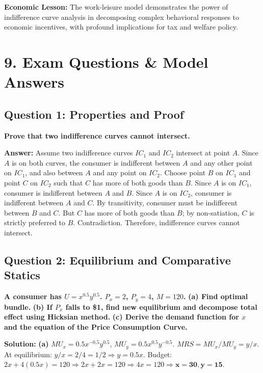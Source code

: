 \documentclass[10pt,a4paper]{article}
\begin{document}
\begin{multicols}{2}
\textbf{Economic Lesson:} The work-leisure model demonstrates the power of indifference curve analysis in decomposing complex behavioral responses to economic incentives, with profound implications for tax and welfare policy.

\section*{9. Exam Questions \& Model Answers}

\subsection*{Question 1: Properties and Proof}
\textbf{Prove that two indifference curves cannot intersect.}

\textbf{Answer:} Assume two indifference curves $IC_1$ and $IC_2$ intersect at point $A$. Since $A$ is on both curves, the consumer is indifferent between $A$ and any other point on $IC_1$, and also between $A$ and any point on $IC_2$. Choose point $B$ on $IC_1$ and point $C$ on $IC_2$ such that $C$ has more of both goods than $B$. Since $A$ is on $IC_1$, consumer is indifferent between $A$ and $B$. Since $A$ is on $IC_2$, consumer is indifferent between $A$ and $C$. By transitivity, consumer must be indifferent between $B$ and $C$. But $C$ has more of both goods than $B$; by non-satiation, $C$ is strictly preferred to $B$. Contradiction. Therefore, indifference curves cannot intersect.

\vspace{0.2cm}

\subsection*{Question 2: Equilibrium and Comparative Statics}
\textbf{A consumer has $U = x^{0.5} y^{0.5}$. $P_x = 2$, $P_y = 4$, $M = 120$.}
\textbf{(a) Find optimal bundle.}
\textbf{(b) If $P_x$ falls to \$1, find new equilibrium and decompose total effect using Hicksian method.}
\textbf{(c) Derive the demand function for $x$ and the equation of the Price Consumption Curve.}

\vspace{0.1cm}
\textbf{Solution:}
\textbf{(a)} $MU_x = 0.5 x^{-0.5} y^{0.5}$, $MU_y = 0.5 x^{0.5} y^{-0.5}$.
$MRS = MU_x/MU_y = y/x$. At equilibrium: $y/x = 2/4 = 1/2 \Rightarrow y = 0.5x$.
Budget: $2x + 4(0.5x) = 120 \Rightarrow 2x + 2x = 120 \Rightarrow 4x = 120 \Rightarrow \mathbf{x=30, y=15}$.


\end{multicols}
\end{document}
